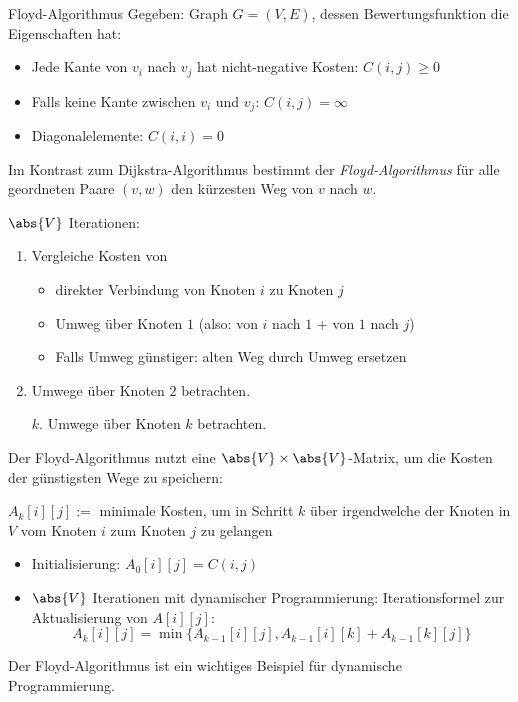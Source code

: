 \begin{algo}{Floyd-Algorithmus}
    Gegeben: Graph $G = (V, E)$, dessen Bewertungsfunktion die Eigenschaften hat:
    \begin{itemize}
        \item Jede Kante von $v_i$ nach $v_j$ hat nicht-negative Kosten: $C(i, j) \geq 0$
        \item Falls keine Kante zwischen $v_i$ und $v_j$: $C(i, j) = \infty$
        \item Diagonalelemente: $C(i, i) = 0$
    \end{itemize}

    Im Kontrast zum Dijkstra-Algorithmus bestimmt der \emph{Floyd-Algorithmus} für alle geordneten Paare $(v, w)$ den kürzesten Weg von $v$ nach $w$.

    $\abs{V}$ Iterationen:
    \begin{enumerate}
        \item Vergleiche Kosten von
              \begin{itemize}
                  \item direkter Verbindung von Knoten $i$ zu Knoten $j$
                  \item Umweg über Knoten $1$ (also: von $i$ nach $1$ + von $1$ nach $j$)
                  \item Falls Umweg günstiger: alten Weg durch Umweg ersetzen
              \end{itemize}
        \item Umwege über Knoten $2$ betrachten.
        \item[$k$.] Umwege über Knoten $k$ betrachten.
    \end{enumerate}

    Der Floyd-Algorithmus nutzt eine $\abs{V} \times \abs{V}$-Matrix, um die Kosten der günstigsten Wege zu speichern:
    \begin{center}
        $A_k[i][j] :=$ minimale Kosten, um in Schritt $k$ über irgendwelche der Knoten in $V$ vom Knoten $i$ zum Knoten $j$ zu gelangen
    \end{center}

    \begin{itemize}
        \item Initialisierung: $A_0[i][j]= C(i, j)$
        \item $\abs{V}$ Iterationen mit \glqq dynamischer Programmierung\grqq:
              \subitem Iterationsformel zur Aktualisierung von $A[i][j]$:
              $$
                  A_k[i][j] = \min \{ A_{k-1}[i][j] , A_{k-1}[i][k] + A_{k-1}[k][j] \}
              $$
    \end{itemize}

    Der Floyd-Algorithmus ist ein wichtiges Beispiel für dynamische Programmierung.
\end{algo}

